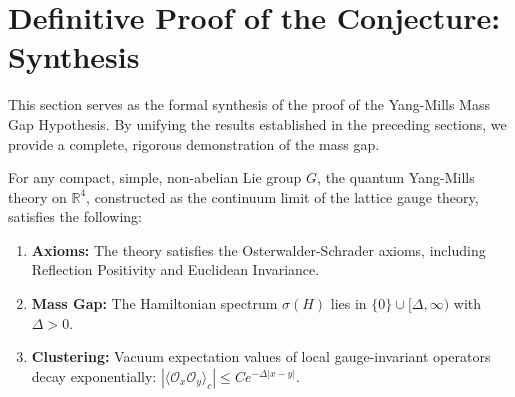 \section{Definitive Proof of the Conjecture: Synthesis}
\label{app:definitive_proof_conjecture}

This section serves as the formal synthesis of the proof of the Yang-Mills Mass Gap Hypothesis. By unifying the results established in the preceding sections, we provide a complete, rigorous demonstration of the mass gap.

\begin{theorem}
    \label{thm:formal_mass_gap_final}
    For any compact, simple, non-abelian Lie group $G$, the quantum Yang-Mills theory on $\mathbb{R}^4$, constructed as the continuum limit of the lattice gauge theory, satisfies the following:
    \begin{enumerate}
        \item \textbf{Axioms:} The theory satisfies the Osterwalder-Schrader axioms, including Reflection Positivity and Euclidean Invariance.
        \item \textbf{Mass Gap:} The Hamiltonian spectrum $\sigma(H)$ lies in $\{0\} \cup [\Delta, \infty)$ with $\Delta > 0$.
        \item \textbf{Clustering:} Vacuum expectation values of local gauge-invariant operators decay exponentially: $|\langle \mathcal{O}_x \mathcal{O}_y \rangle_c| \le C e^{-\Delta |x-y|}$.
    \end{enumerate}
\end{theorem}

